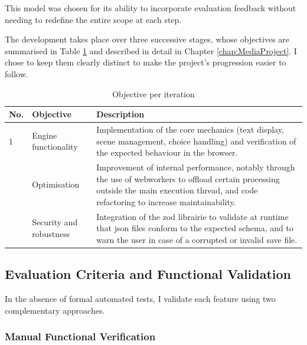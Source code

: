 This model was chosen for its ability to incorporate evaluation feedback without needing to redefine the entire scope at each step.

\clearpage

The development takes place over three successive stages, whose objectives are summarised in Table \ref{tab:objectifs_iterations} and described in detail in Chapter \ref{chap:MediaProject}. I chose to keep them clearly distinct to make the project's progression easier to follow.

\begin{table}[H]
    \centering
    \caption{Objective per iteration}
    \renewcommand{\arraystretch}{1.5}
    \begin{tabular}{p{0.5cm} p{2.7cm} p{9.5cm}}
        \hline
        \textbf{No.} & \textbf{Objective} & \textbf{Description} \\
        \hline
        1 & Engine functionality & Implementation of the core mechanics (text display, scene management, choice handling) and verification of the expected behaviour in the browser. \\
        \addlinespace
        2 & Optimisation & Improvement of internal performance, notably through the use of \glspl{webworker} to offload certain processing outside the main execution thread, and code refactoring to increase maintainability. \\
        \addlinespace
        3 & Security and robustness & Integration of the \gls{zod} \gls{librairie} to validate at runtime that \gls{json} files conform to the expected \gls{schema}, and to warn the user in case of a corrupted or invalid save file. \\
        \hline
    \end{tabular}
    \label{tab:objectifs_iterations}
\end{table}

\clearpage


\subsection{Evaluation Criteria and Functional Validation}

In the absence of formal automated tests, I validate each feature using two complementary approaches.


\subsubsection{Manual Functional Verification}

